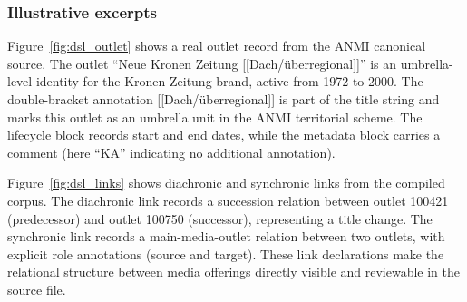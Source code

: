 \documentclass[11pt]{article}
\begin{document}
\subsubsection*{Illustrative excerpts}

Figure~\ref{fig:dsl_outlet} shows a real outlet record from the ANMI canonical source. The outlet ``Neue Kronen Zeitung [[Dach/\"uberregional]]'' is an umbrella-level identity for the Kronen Zeitung brand, active from 1972 to 2000. The double-bracket annotation [[Dach/\"uberregional]] is part of the title string and marks this outlet as an umbrella unit in the ANMI territorial scheme. The lifecycle block records start and end dates, while the metadata block carries a comment (here ``KA'' indicating no additional annotation).

Figure~\ref{fig:dsl_links} shows diachronic and synchronic links from the compiled corpus. The diachronic link records a succession relation between outlet 100421 (predecessor) and outlet 100750 (successor), representing a title change. The synchronic link records a main-media-outlet relation between two outlets, with explicit role annotations (source and target). These link declarations make the relational structure between media offerings directly visible and reviewable in the source file.
\end{document}
